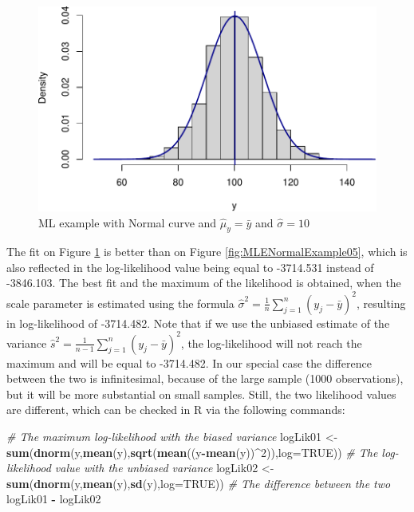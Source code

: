 \documentclass[
]{book}
\newenvironment{Shaded}{\begin{snugshade}}{\end{snugshade}}
\newcommand{\AttributeTok}[1]{\textcolor[rgb]{0.13,0.29,0.53}{#1}}
\newcommand{\CommentTok}[1]{\textcolor[rgb]{0.56,0.35,0.01}{\textit{#1}}}
\newcommand{\ConstantTok}[1]{\textcolor[rgb]{0.56,0.35,0.01}{#1}}
\newcommand{\DecValTok}[1]{\textcolor[rgb]{0.00,0.00,0.81}{#1}}
\newcommand{\FunctionTok}[1]{\textcolor[rgb]{0.13,0.29,0.53}{\textbf{#1}}}
\newcommand{\NormalTok}[1]{#1}
\newcommand{\OtherTok}[1]{\textcolor[rgb]{0.56,0.35,0.01}{#1}}
\newcommand{\SpecialCharTok}[1]{\textcolor[rgb]{0.81,0.36,0.00}{\textbf{#1}}}
\theoremstyle{definition}
\theoremstyle{definition}
\theoremstyle{definition}
\theoremstyle{definition}
\theoremstyle{remark}
\begin{document}
\begin{figure}
\centering
\includegraphics{Svetunkov---Statistics-for-Business-Analytics_files/figure-latex/MLENormalExample06-1.pdf}
\caption{\label{fig:MLENormalExample06}ML example with Normal curve and \(\hat{\mu}_y=\bar{y}\) and \(\hat{\sigma}=10\)}
\end{figure}

The fit on Figure \ref{fig:MLENormalExample06} is better than on Figure \ref{fig:MLENormalExample05}, which is also reflected in the log-likelihood value being equal to -3714.531 instead of -3846.103. The best fit and the maximum of the likelihood is obtained, when the scale parameter is estimated using the formula \(\hat{\sigma}^2 = \frac{1}{n}\sum_{j=1}^n\left(y_j - \bar{y}\right)^2\), resulting in log-likelihood of -3714.482. Note that if we use the unbiased estimate of the variance \(\hat{s}^2 = \frac{1}{n-1}\sum_{j=1}^n\left(y_j - \bar{y}\right)^2\), the log-likelihood will not reach the maximum and will be equal to -3714.482. In our special case the difference between the two is infinitesimal, because of the large sample (1000 observations), but it will be more substantial on small samples. Still, the two likelihood values are different, which can be checked in R via the following commands:

\begin{Shaded}
\begin{Highlighting}[]
\CommentTok{\# The maximum log{-}likelihood with the biased variance}
\NormalTok{logLik01 }\OtherTok{\textless{}{-}} \FunctionTok{sum}\NormalTok{(}\FunctionTok{dnorm}\NormalTok{(y,}\FunctionTok{mean}\NormalTok{(y),}\FunctionTok{sqrt}\NormalTok{(}\FunctionTok{mean}\NormalTok{((y}\SpecialCharTok{{-}}\FunctionTok{mean}\NormalTok{(y))}\SpecialCharTok{\^{}}\DecValTok{2}\NormalTok{)),}\AttributeTok{log=}\ConstantTok{TRUE}\NormalTok{))}
\CommentTok{\# The log{-}likelihood value with the unbiased variance}
\NormalTok{logLik02 }\OtherTok{\textless{}{-}} \FunctionTok{sum}\NormalTok{(}\FunctionTok{dnorm}\NormalTok{(y,}\FunctionTok{mean}\NormalTok{(y),}\FunctionTok{sd}\NormalTok{(y),}\AttributeTok{log=}\ConstantTok{TRUE}\NormalTok{))}
\CommentTok{\# The difference between the two}
\NormalTok{logLik01 }\SpecialCharTok{{-}}\NormalTok{ logLik02}
\end{Highlighting}
\end{Shaded}
\end{document}
